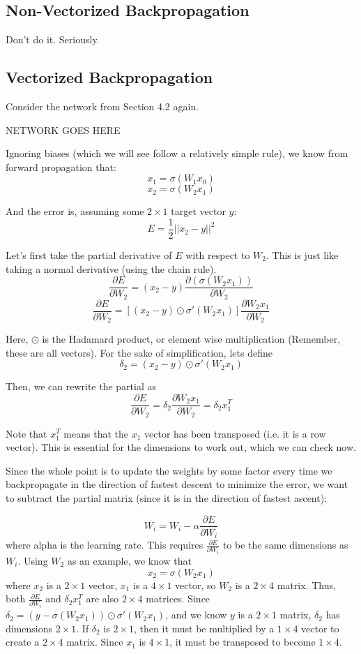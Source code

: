 \documentclass{article}
\begin{document}
\subsection{Non-Vectorized Backpropagation}
Don't do it. Seriously.

\subsection{Vectorized Backpropagation}
Consider the network from Section 4.2 again.

NETWORK GOES HERE

Ignoring biases (which we will see follow a relatively simple rule),
we know from forward propagation that:
\[x_1 = \sigma(W_1x_0)\]
\[x_2 = \sigma(W_2x_1)\]

And the error is, assuming some $2 \times 1$ target vector $y$:
\[E = \frac{1}{2}||x_2-y||^2\]

Let's first take the partial derivative of $E$ with respect to $W_2$. This is just like taking a normal derivative (using the chain rule).
\[\frac{\partial E}{\partial W_2} = (x_2 - y) \frac{\partial (\sigma(W_2x_1))}{\partial W_2}\]
\[\frac{\partial E}{\partial W_2} = [(x_2 - y) \odot \sigma'(W_2x_1)] \frac{\partial W_2x_1}{\partial W_2}\]

Here, $\odot$ is the Hadamard product, or element wise multiplication (Remember, these are all vectors). For the sake of simplification, lets define
\[\delta_2 = (x_2 - y) \odot \sigma'(W_2x_1)\]

Then, we can rewrite the partial as
\[\frac{\partial E}{\partial W_2} = \delta_2 \frac{\partial W_2x_1}{\partial W_2} = \delta_2 x_1^T\]

Note that $x_1^T$ means that the $x_1$ vector has been transposed (i.e. it is a row vector). This is essential for the dimensions to work out, which we can check now.

Since the whole point is to update the weights by some factor every time we backpropagate in the direction of fastest descent to minimize the error, we want to subtract the partial matrix (since it is in the direction of fastest ascent):

\[W_i =  W_i - \alpha \frac{\partial E}{\partial W_i}\]
where alpha is the learning rate. This requires $\frac{\partial E}{\partial W_i}$ to be the same dimensions as $W_i$. Using $W_2$ as an example, we know that
\[x_2 = \sigma(W_2x_1)\]
where $x_2$ is a $2 \times 1$ vector, $x_1$ is a $4 \times 1$ vector, so $W_2$ is a $2 \times 4$ matrix. Thus, both $\frac{\partial E}{\partial W_i}$ and $\delta_2 x_1^T$ are also $2 \times 4$ matrices. Since $\delta_2 = (y - \sigma(W_2x_1)) \odot \sigma'(W_2x_1)$, and we know $y$ is a $2 \times 1$ matrix, $\delta_2$ has dimensions $2 \times 1$. If $\delta_2$ is $2 \times 1$, then it must be multiplied by a $1 \times 4$ vector to create a $2 \times 4$ matrix. Since $x_1$ is $4 \times 1$, it must be transposed to become $1 \times 4$.
\end{document}
